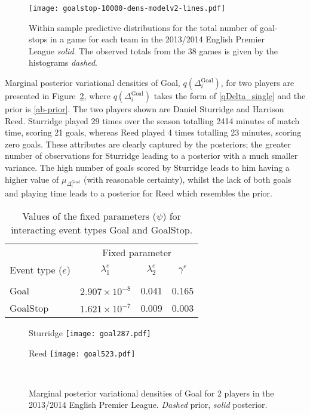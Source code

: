 \documentclass[11pt,a4paper]{article}
\begin{document}
\begin{figure}[t]
      \centering
      \texttt{[image: goalstop-10000-dens-modelv2-lines.pdf]}
      \caption{Within sample predictive distributions for the total number of goal-stops in a game for each team in the 2013/2014 English Premier League \emph{solid}. The observed totals from the 38 games is given by the histograms \emph{dashed}.}  \label{goalstopdensfig}
\end{figure} 





Marginal posterior variational densities of Goal, 
$q(\Delta_i^{\textrm{Goal}})$, for two players are presented in 
Figure~\ref{playerfig}, where $q(\Delta_i^{\textrm{Goal}})$ takes 
the form of \eqref{qDelta_single} and the prior is \eqref{ab-prior}. 
The two players shown are Daniel Sturridge and Harrison Reed. 
Sturridge played 29 times over the season totalling 2414 minutes of 
match time, scoring 21 goals, whereas Reed played 4 times totalling 
23 minutes, scoring zero goals. These attributes are clearly captured 
by the posteriors; the greater number of observations for Sturridge 
leading to a posterior with a much smaller variance. The high number 
of goals scored by Sturridge leads to him having a higher value of 
$\mu_{\Delta_i^{\textrm{Goal}}}$ (with reasonable certainty), whilst 
the lack of both goals and playing time leads to a posterior for Reed 
which resembles the prior.

\begin{table}[h] 
\caption{Values of the fixed parameters ($\psi$) for interacting event types Goal and GoalStop.} \label{tableparam}
\centering
\begin{tabular}{l|ccc}
\hline
& \multicolumn{3}{c}{Fixed parameter}\\
Event type ($e$) & $\lambda_1^e$ & $\lambda_2^e$ & $\gamma^e$  \\[0.3ex]
\hline \\[-1.9ex]
Goal & $2.907\times 10^{-8}$ & 0.041 & 0.165 \\[0.3ex]
GoalStop & $1.621\times 10^{-7}$ & 0.009 & 0.003 \\
\hline
\end{tabular}
\end{table}

\begin{figure}%
\begin{minipage}[b]{0.48\linewidth}
        \centering
        \qquad\quad Sturridge\vspace{0.01cm}
        \texttt{[image: goal287.pdf]}
\end{minipage} 
\begin{minipage}[b]{0.48\linewidth}
        \centering
        \qquad\quad Reed\vspace{0.01cm}
        \texttt{[image: goal523.pdf]}
\end{minipage} \\
      \caption{Marginal posterior variational densities of Goal for 2 players in the 2013/2014 English Premier League. \emph{Dashed} prior, \emph{solid} posterior.} \label{playerfig}
\end{figure} 
\end{document}
